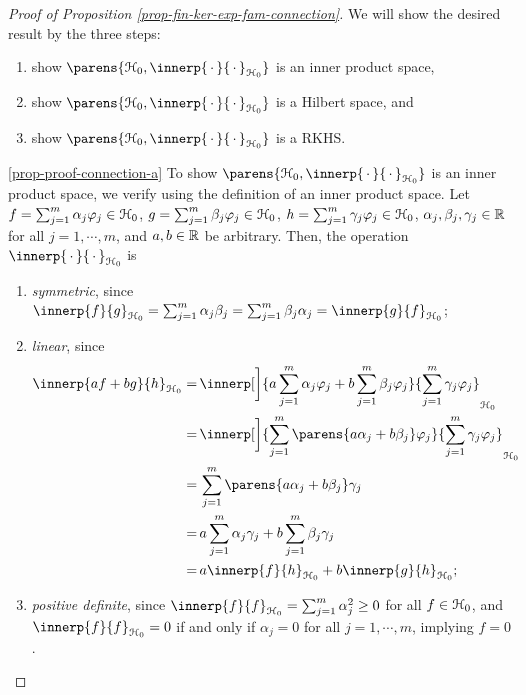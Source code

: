 \begin{proof}[Proof of Proposition \ref{prop-fin-ker-exp-fam-connection}]
	
	We will show the desired result by the three steps: 
	\begin{enumerate}[label=(\alph*)]
		\item \label{prop-proof-connection-a} show $\parens{\calH_{0}, \innerp{\,\cdot\,}{\,\cdot\,}_{\calH_0}}$ is an inner product space, 
		\item \label{prop-proof-connection-b} show $\parens{\calH_0, \innerp{\,\cdot\,}{\,\cdot\,}_{\calH_0}}$ is a Hilbert space, and
		\item \label{prop-proof-connection-c} show $\parens{\calH_0, \innerp{\,\cdot\,}{\,\cdot\,}_{\calH_0}}$ is a RKHS. 
	\end{enumerate}
	
	\ref{prop-proof-connection-a} To show $\parens{\calH_0, \innerp{\,\cdot\,}{\,\cdot\,}_{\calH_0}}$ is an inner product space, we verify using the definition of an inner product space. Let $f = \sum_{j=1}^m \alpha_j \varphi_j \in \mathcal{H}_0$, $g = \sum_{j=1}^m \beta_j \varphi_j \in \mathcal{H}_0$, $h = \sum_{j=1}^m \gamma_j \varphi_j \in \mathcal{H}_0$, $\alpha_j, \beta_j, \gamma_j \in \mathbb{R}$ for all $j = 1, \cdots, m$, and $a, b \in \mathbb{R}$ be arbitrary. Then, the operation $\innerp{\,\cdot\,}{\,\cdot\,}_{\calH_0}$ is 
	\begin{enumerate}[label=(\roman*)]
		\item \textit{symmetric}, since $\innerp{f}{g}_{\calH_0} = \sum_{j=1}^m \alpha_{j} \beta_{j} = \sum_{j=1}^m \beta_{j} \alpha_{j} = \innerp{g}{f}_{\calH_0}$; 
		\item \textit{linear}, since 
		\begin{align*}
			\innerp{a f + b g}{h}_{\calH_0} = & \, \innerp[\bigg]{a \sum_{j=1}^m \alpha_j \varphi_j + b \sum_{j=1}^m \beta_j \varphi_j}{\sum_{j=1}^m \gamma_j \varphi_j}_{\calH_0} \\ 
			= & \, \innerp[\bigg]{\sum_{j=1}^m \parens{a \alpha_j + b \beta_j} \varphi_j}{\sum_{j=1}^m \gamma_j \varphi_j}_{\calH_0} \\ 
			= & \, \sum_{j=1}^m \parens{a \alpha_j + b \beta_j} \gamma_j \\ 
			= & \, a \sum_{j=1}^m \alpha_j \gamma_j + b \sum_{j=1}^m \beta_j \gamma_j \\ 
			= & \, a \innerp{f}{h}_{\calH_0} + b \innerp{g}{h}_{\calH_0}; 
		\end{align*} 
		
		\item \textit{positive definite}, since $\innerp{f}{f}_{\calH_0} = \sum_{j=1}^m \alpha_j^2 \ge 0$ for all $f \in \mathcal{H}_0$, and $\innerp{f}{f}_{\calH_0} = 0$ if and only if $\alpha_j = 0$ for all $j = 1, \cdots, m$, implying $f = 0$. 
	\end{enumerate}


\end{proof}

